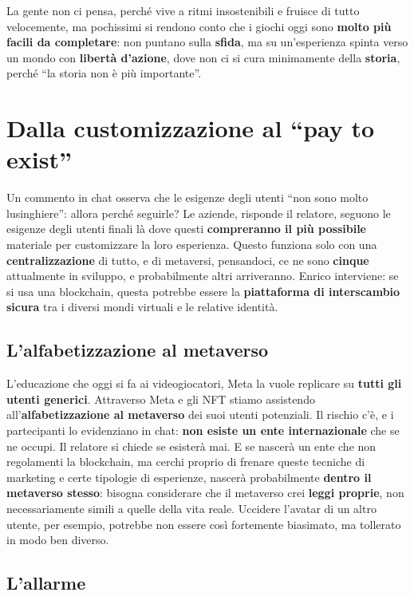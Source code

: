 La gente non ci pensa, perché vive a ritmi insostenibili e fruisce di tutto
velocemente, ma pochissimi si rendono conto che i giochi oggi sono \textbf{molto
più facili da completare}: non puntano sulla \textbf{sfida}, ma su un'esperienza
spinta verso un mondo con \textbf{libertà d'azione}, dove non ci si cura
minimamente della \textbf{storia}, perché ``la storia non è più importante''.

\section{Dalla customizzazione al ``pay to exist''}
\label{z8:sec:pay-to-exist}

Un commento in chat osserva che le esigenze degli utenti ``non sono molto
lusinghiere'': allora perché seguirle? Le aziende, risponde il relatore, seguono
le esigenze degli utenti finali là dove questi \textbf{compreranno il più
possibile} materiale per customizzare la loro esperienza. Questo funziona solo
con una \textbf{centralizzazione} di tutto, e di metaversi, pensandoci, ce ne
sono \textbf{cinque} attualmente in sviluppo, e probabilmente altri arriveranno.
Enrico interviene: se si usa una blockchain, questa potrebbe essere la
\textbf{piattaforma di interscambio sicura} tra i diversi mondi virtuali e le
relative identità.

\subsection{L'alfabetizzazione al metaverso}

L'educazione che oggi si fa ai videogiocatori, Meta la vuole replicare su
\textbf{tutti gli utenti generici}. Attraverso Meta e gli NFT stiamo assistendo
all'\textbf{alfabetizzazione al metaverso} dei suoi utenti potenziali. Il rischio
c'è, e i partecipanti lo evidenziano in chat: \textbf{non esiste un ente
internazionale} che se ne occupi. Il relatore si chiede se esisterà mai. E se
nascerà un ente che non regolamenti la blockchain, ma cerchi proprio di frenare
queste tecniche di marketing e certe tipologie di esperienze, nascerà
probabilmente \textbf{dentro il metaverso stesso}: bisogna considerare che il
metaverso crei \textbf{leggi proprie}, non necessariamente simili a quelle della
vita reale. Uccidere l'avatar di un altro utente, per esempio, potrebbe non
essere così fortemente biasimato, ma tollerato in modo ben diverso.

\subsection{L'allarme}

